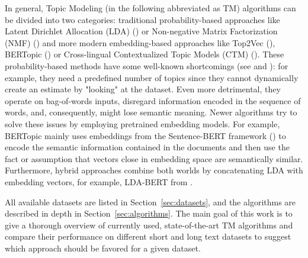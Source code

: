 \documentclass[11pt]{article}
\begin{document}
In general, Topic Modeling (in the following abbreviated as TM) algorithms can be divided into two categories: traditional probability-based approaches like Latent Dirichlet Allocation (LDA) (\citealp{lda}) or Non-negative Matrix Factorization (NMF) (\citealp{nmf}) and more modern embedding-based approaches like Top2Vec (\citealp{top2vec}), BERTopic (\citealp{bertopic}) or Cross-lingual Contextualized Topic Models (CTM) (\citealp{ctm}). These probability-based methods have some well-known shortcomings (see \citealp{lda-bert} and \citealp{bertopic}): for example, they need a predefined number of topics since they cannot dynamically create an estimate by "looking" at the dataset. Even more detrimental, they operate on bag-of-words inputs, disregard information encoded in the sequence of words, and, consequently, might lose semantic meaning. Newer algorithms try to solve these issues by employing pretrained embedding models. For example, BERTopic mainly uses embeddings from the Sentence-BERT framework (\citealp{sbert}) to encode the semantic information contained in the documents and then use the fact or assumption that vectors close in embedding space are semantically similar. Furthermore, hybrid approaches combine both worlds by concatenating LDA with embedding vectors, for example, LDA-BERT from \citet{lda-bert}. 

All available datasets are listed in Section~\ref{sec:datasets}, 
 and the algorithms are described in depth in Section~\ref{sec:algorithms}. The main goal of this work is to give a thorough overview of currently used, state-of-the-art TM algorithms and compare their performance on different short and long text datasets to suggest which approach should be favored for a given dataset.
\end{document}
